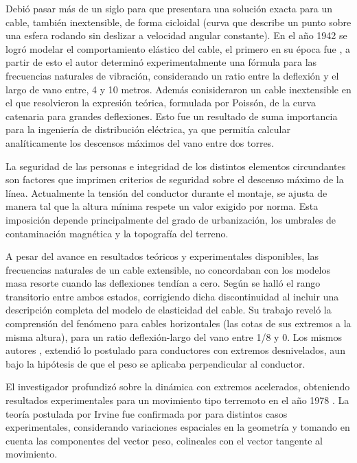 Debió pasar más de un siglo para que \cite{routh1955dynamics} presentara una solución exacta para un cable, también inextensible, de forma cicloidal (curva que describe un punto sobre una esfera rodando sin deslizar a velocidad angular constante). En el año 1942 se logró modelar el comportamiento elástico del cable, el primero en su época fue \cite{Kloppel1942}, a partir de esto el autor \cite{Pugsley1949} determinó experimentalmente una fórmula para las frecuencias naturales de vibración, considerando un ratio entre la deflexión y el largo de vano entre, 4 y 10 metros. Además \cite{Saxon1953} conisideraron un cable inextensible en el que resolvieron la expresión teórica, formulada por Poissón, de la curva catenaria para grandes deflexiones. Esto fue un resultado de suma importancia para la ingeniería de distribución eléctrica, ya que permitía calcular analíticamente los descensos máximos del vano entre dos torres.

La seguridad de las personas e integridad de los distintos elementos circundantes son factores que imprimen criterios de seguridad sobre el descenso máximo de la línea. Actualmente la tensión del conductor durante el montaje, se ajusta de manera tal que la altura mínima respete un valor exigido por norma. Esta imposición depende principalmente del grado de urbanización, los umbrales de contaminación magnética y la topografía del terreno.   

A pesar del avance en resultados teóricos y experimentales disponibles, las frecuencias naturales de un cable extensible, no concordaban con los modelos masa resorte cuando las deflexiones tendían a cero. Según \cite{Irvine1974} se halló el rango transitorio entre ambos estados, corrigiendo dicha discontinuidad al incluir una descripción completa del modelo de elasticidad del cable. Su trabajo reveló la comprensión del fenómeno para cables horizontales (las cotas de sus extremos a la misma altura), para un ratio deflexión-largo del vano entre 1/8 y 0. Los mismos autores \cite{Irvine1974}, extendió lo postulado para conductores con extremos desnivelados, aun bajo la hipótesis de que el peso se aplicaba perpendicular al conductor.

El investigador \cite{Irvine1976} profundizó sobre la dinámica con extremos acelerados, obteniendo resultados experimentales para un movimiento tipo terremoto en el año 1978 \citep{Irvine1978}. La teoría postulada por Irvine fue confirmada por \cite{Triantafyllou1984} para distintos casos experimentales,  considerando variaciones espaciales en la geometría y tomando en cuenta las componentes del vector peso, colineales con el vector tangente al movimiento.

